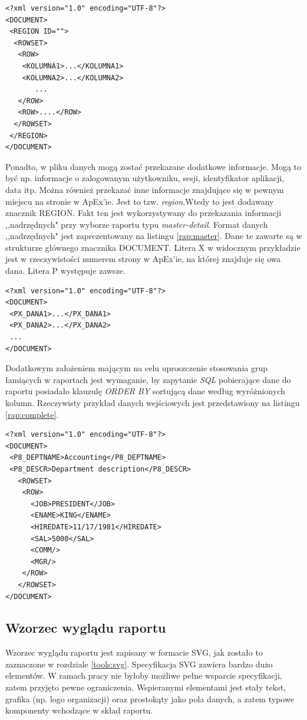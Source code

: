 \documentclass[11pt,a4paper]{article}
\begin{document}
\lstset{language=XML}
\begin{lstlisting}[frame=single,caption=Ogólna postać dokumentu XML z danymi pochodzącymi z ApExa,label=rap:apex]
<?xml version="1.0" encoding="UTF-8"?>
<DOCUMENT>
 <REGION ID="">
  <ROWSET>
   <ROW>
    <KOLUMNA1>...</KOLUMNA1>
    <KOLUMNA2>...</KOLUMNA2>
       ...	
   </ROW>
   <ROW>....</ROW>
  </ROWSET>
 </REGION>
</DOCUMENT>
\end{lstlisting}

Ponadto, w pliku danych mogą zostać przekazane dodatkowe informacje. Mogą to być np. informacje o zalogowanym użytkowniku, sesji, identyfikator aplikacji, data itp. Można również przekazać inne informacje znajdujące się w pewnym miejscu na stronie w ApEx'ie. Jest to tzw. \emph{region}.Wtedy to jest dodawany znacznik REGION. Fakt ten jest wykorzystywany do przekazania informacji ,,nadrzędnych" przy wyborze raportu typu \emph{master-detail}. Format danych ,,nadrzędnych" jest zaprezentowany na listingu \ref{rap:master}. Dane te zawarte są w strukturze głównego znacznika DOCUMENT. Litera X w widocznym przykładzie jest w rzeczywistości numerem strony w ApEx'ie, na której znajduje się owa dana. Litera P występuje zawsze. 

\lstset{language=XML}
\begin{lstlisting}[frame=single,caption=Format danych typu \emph{master},label=rap:master]
<?xml version="1.0" encoding="UTF-8"?>
<DOCUMENT>
 <PX_DANA1>...</PX_DANA1>
 <PX_DANA2>...</PX_DANA2>
 ...
</DOCUMENT>
\end{lstlisting}

Dodatkowym założeniem mającym na celu uproszczenie stosowania grup łamiących w raportach jest wymaganie, by zapytanie \emph{SQL} pobierające dane do raportu posiadało klauzulę \emph{ORDER BY} sortującą dane według wyróżnionych kolumn. Rzeczywisty przykład danych wejściowych jest przedstawiony na listingu \ref{rap:complete}.

\lstset{language=XML}
\begin{lstlisting}[frame=single,caption=Przykładowe dane,label=rap:complete]
<?xml version="1.0" encoding="UTF-8"?>
<DOCUMENT>
 <P8_DEPTNAME>Accounting</P8_DEPTNAME>
 <P8_DESCR>Department description</P8_DESCR>
   <ROWSET>
    <ROW>
      <JOB>PRESIDENT</JOB>
      <ENAME>KING</ENAME>
      <HIREDATE>11/17/1981</HIREDATE>
      <SAL>5000</SAL>
      <COMM/>
      <MGR/>
    </ROW>
   </ROWSET>
</DOCUMENT>
\end{lstlisting}

\subsection{Wzorzec wyglądu raportu} \label{solution:layout}
Wzorzec wyglądu raportu jest zapisany w formacie SVG, jak zostało to zaznaczone w rozdziale \ref{tools:svg}. Specyfikacja SVG zawiera bardzo dużo elementów. W ramach pracy nie byłoby możliwe pełne wsparcie specyfikacji, zatem przyjęto pewne ograniczenia. Wspieranymi elementami jest stały tekst, grafika (np. logo organizacji) oraz prostokąty jako pola danych, a zatem typowe komponenty wchodzące w skład raportu.
\end{document}
